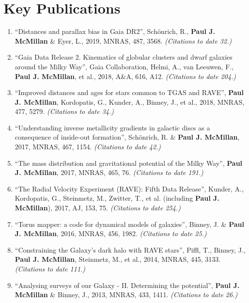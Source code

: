 \documentclass{resume}
\begin{document}
\section*{Key Publications}

\begin{enumerate}
\item ``Distances and parallax bias in Gaia DR2'', Sch\"onrich, R., \textbf{Paul J. McMillan} \& Eyer, L., 2019, MNRAS, 487, 3568. \textit{(Citations to date 32.)}

\item ``Gaia Data Release 2. Kinematics of globular clusters and dwarf galaxies around the Milky Way'', Gaia Collaboration, Helmi, A., van Leeuwen, F., \textbf{Paul J. McMillan}, et al., 2018, A\&A, 616, A12. \textit{(Citations to date 204.)}

\item ``Improved distances and ages for stars common to TGAS and RAVE'', \textbf{Paul J. McMillan}, Kordopatis, G., Kunder, A., Binney, J., et al., 2018, MNRAS, 477, 5279. \textit{(Citations to date 34.)}

\item ``Understanding inverse metallicity gradients in galactic discs as a consequence of inside-out formation'', Sch\"onrich, R. \& \textbf{Paul J. McMillan}, 2017, MNRAS, 467, 1154. \textit{(Citations to date 42.)}

\item ``The mass distribution and gravitational potential of the Milky Way'', \textbf{Paul J. McMillan}, 2017, MNRAS, 465, 76. \textit{(Citations to date 191.)}

\item ``The Radial Velocity Experiment (RAVE): Fifth Data Release'', Kunder, A., Kordopatis, G., Steinmetz, M., Zwitter, T., et al. (including \textbf{Paul J. McMillan}), 2017, AJ, 153, 75. \textit{(Citations to date 254.)}

\item ``Torus mapper: a code for dynamical models of galaxies'', Binney, J. \& \textbf{Paul J. McMillan}, 2016, MNRAS, 456, 1982. \textit{(Citations to date 25.)}

\item ``Constraining the Galaxy's dark halo with RAVE stars'', Piffl, T., Binney, J., \textbf{Paul J. McMillan}, Steinmetz, M., et al., 2014, MNRAS, 445, 3133. \textit{(Citations to date 111.)}

\item ``Analysing surveys of our Galaxy - II. Determining the potential'', \textbf{Paul J. McMillan} \& Binney, J., 2013, MNRAS, 433, 1411. \textit{(Citations to date 26.)}


\end{enumerate}
\end{document}
